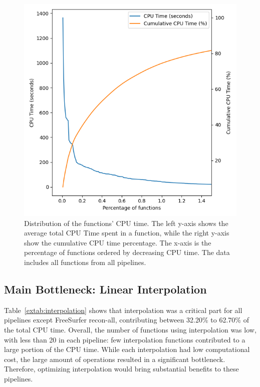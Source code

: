 \documentclass[conference]{IEEEtran}
\begin{document}
\begin{figure}[ht]
	\centering
	\includegraphics[width=\linewidth]{figures/global-longtail.png}
	\caption{Distribution of the functions' CPU time. The left y-axis shows the average total CPU Time spent in a function, while the right y-axis show the cumulative CPU time percentage. The x-axis is the percentage of functions ordered by decreasing CPU time. The data includes all functions from all pipelines. }
	\label{fig:long-tail-distribution}
\end{figure}

\subsection{Main Bottleneck: Linear Interpolation}
Table~\ref{extab:interpolation} shows that interpolation was a critical part for all pipelines except FreeSurfer recon-all, contributing between 32.20\% to 62.70\% of the total CPU time. Overall, the number of functions using interpolation was low, with less than 20 in each pipeline: few interpolation functions contributed to a large portion of the CPU time. While each interpolation had low computational cost, the large amount of operations resulted in a significant bottleneck. Therefore, optimizing interpolation would bring substantial benefits to these pipelines.
\end{document}
